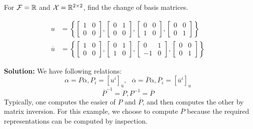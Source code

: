 \begin{example}
For $\mathcal{F}=\mathbb R$ and $\mathcal{X} = \mathbb R^{2 \times 2}$, find the change of basis matrices.

    \begin{align*}
        u&=\left\{ \left[\begin{array}{rr}
            1 & 0\\
            0 & 0
            \end{array}\right],\left[\begin{array}{rr}
            0 & 1\\
            0 & 0
            \end{array}\right],\left[\begin{array}{rr}
            0 & 0\\
            1 & 0
            \end{array}\right],\left[\begin{array}{rr}
            0 & 0\\
            0 & 1
            \end{array}\right]\right\}\\
        \overline{u}&=\left\{ \left[\begin{array}{rr}
            1 & 0\\
            0 & 0
            \end{array}\right],\left[\begin{array}{rr}
            0 & 1\\
            1 & 0
            \end{array}\right],\left[\begin{array}{rr}
            0 & 1\\
            -1 & 0
            \end{array}\right],\left[\begin{array}{rr}
            0 & 0\\
            0 & 1
        \end{array}\right]\right\}
    \end{align*}
    
\end{example} 

   \textbf{Solution:} We have following relations:
    $$\alpha=P\overline{\alpha}, P_i=[u^i]_{\overline{u}},~~~ \overline{\alpha}=\overline{P}\alpha, \overline{P}_i=[\overline{u}^i]_u$$ 
    $$\overline{P}^{-1}=P, P^{-1}=\overline{P}$$
Typically, one computes the easier of $P$ and $\overline{P}$, and then computes the other by matrix inversion. For this example, we choose to compute $\overline{P}$ because the required representations can be computed by inspection.

